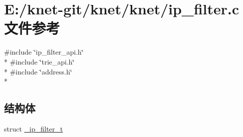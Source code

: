 \hypertarget{a00067}{}\section{E\+:/knet-\/git/knet/knet/ip\+\_\+filter.c 文件参考}
\label{a00067}
{\ttfamily \#include \char`\"{}ip\+\_\+filter\+\_\+api.\+h\char`\"{}}\\*
{\ttfamily \#include \char`\"{}trie\+\_\+api.\+h\char`\"{}}\\*
{\ttfamily \#include \char`\"{}address.\+h\char`\"{}}\\*
\subsection*{结构体}
\begin{DoxyCompactItemize}
\item 
struct \hyperlink{a00017}{\+\_\+ip\+\_\+filter\+\_\+t}
\end{DoxyCompactItemize}
